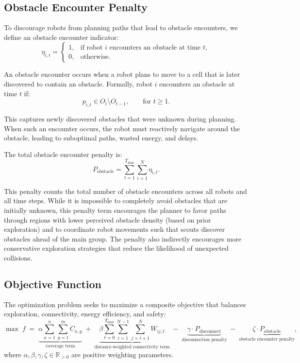 \subsection*{Obstacle Encounter Penalty}

To discourage robots from planning paths that lead to obstacle encounters, we define an obstacle encounter indicator:
\[
    \eta_{i,t} = 
    \begin{cases}
    1, & \text{if robot } i \text{ encounters an obstacle at time } t, \\
    0, & \text{otherwise.}
    \end{cases}
\]

An obstacle encounter occurs when a robot plans to move to a cell that is later discovered to contain an obstacle. Formally, robot $i$ encounters an obstacle at time $t$ if:
\[
    p_{i,t} \in O_t \setminus O_{t-1}, \qquad \text{for } t \ge 1.
\]

This captures newly discovered obstacles that were unknown during planning. When such an encounter occurs, the robot must reactively navigate around the obstacle, leading to suboptimal paths, wasted energy, and delays.

The total obstacle encounter penalty is:
\[
    P_{\text{obstacle}} = \sum_{t=1}^{T_{\text{max}}} \sum_{i=1}^{N} \eta_{i,t}.
\]

This penalty counts the total number of obstacle encounters across all robots and all time steps. While it is impossible to completely avoid obstacles that are initially unknown, this penalty term encourages the planner to favor paths through regions with lower perceived obstacle density (based on prior exploration) and to coordinate robot movements such that scouts discover obstacles ahead of the main group. The penalty also indirectly encourages more conservative exploration strategies that reduce the likelihood of unexpected collisions.

\subsection*{Objective Function}

The optimization problem seeks to maximize a composite objective that balances exploration, connectivity, energy efficiency, and safety:
\[
    \max\; f \;=\;
    \underbrace{\alpha \sum_{x=1}^{n}\sum_{y=1}^{m} C_{x,y}}_{\text{coverage term}}
    \;+\;
    \underbrace{\beta \sum_{t=0}^{T_{\text{max}}}\sum_{i=1}^{N-1}\sum_{j=i+1}^{N} W_{ij,t}}_{\text{distance-weighted connectivity term}}
    \;-\;
    \underbrace{\gamma \cdot P_{\text{disconnect}}}_{\text{disconnection penalty}}
    \;-\;
    \underbrace{\zeta \cdot P_{\text{obstacle}}}_{\text{obstacle encounter penalty}},
\]
where $\alpha, \beta, \gamma, \zeta \in \mathbb{R}_{>0}$ are positive weighting parameters.

